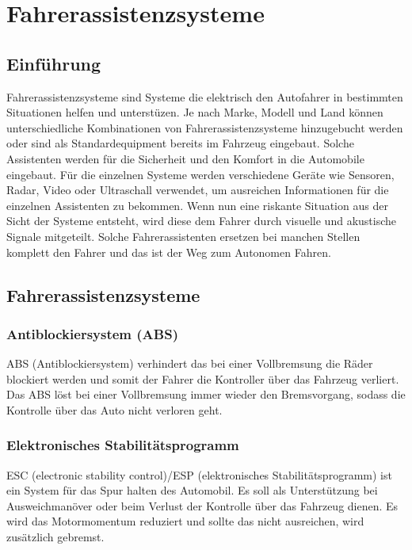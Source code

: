 \section{Fahrerassistenzsysteme}
    \subsection{Einführung}
    Fahrerassistenzsysteme sind Systeme die elektrisch den Autofahrer in bestimmten
    Situationen helfen und unterstüzen. Je nach Marke, Modell und Land können
    unterschiedliche Kombinationen von Fahrerassistenzsysteme hinzugebucht werden
    oder sind als Standardequipment bereits im Fahrzeug eingebaut. Solche Assistenten
    werden für die Sicherheit und den Komfort in die Automobile eingebaut. Für die
    einzelnen Systeme werden verschiedene Geräte wie Sensoren, Radar, Video oder
    Ultraschall verwendet, um ausreichen Informationen für die einzelnen Assistenten
    zu bekommen. Wenn nun eine riskante Situation aus der Sicht der Systeme entsteht,
    wird diese dem Fahrer durch visuelle und akustische Signale mitgeteilt. Solche
    Fahrerassistenten ersetzen bei manchen Stellen komplett den Fahrer und das ist
    der Weg zum Autonomen Fahren.
    \subsection{Fahrerassistenzsysteme}

        \subsubsection{Antiblockiersystem (ABS)}
        ABS (Antiblockiersystem) verhindert das bei einer Vollbremsung die Räder
        blockiert werden und somit der Fahrer die Kontroller über das Fahrzeug verliert.
        Das ABS löst bei einer Vollbremsung immer wieder den Bremsvorgang, sodass die 
        Kontrolle über das Auto nicht verloren geht.

        \subsubsection{Elektronisches Stabilitätsprogramm}
        ESC (electronic stability control)/ESP (elektronisches Stabilitätsprogramm) ist ein System
        für das Spur halten des Automobil. Es soll als Unterstützung bei Ausweichmanöver oder beim Verlust
        der Kontrolle über das Fahrzeug dienen. Es wird das Motormomentum reduziert und sollte das nicht
        ausreichen, wird zusätzlich gebremst.
        
